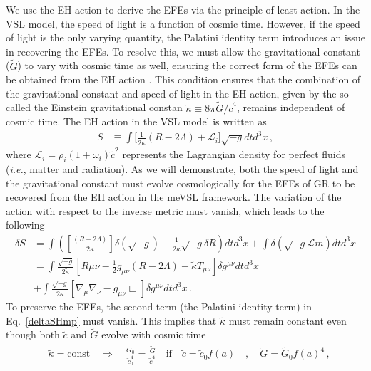 \documentclass[jkps,preprint,fleqn]{revtex4} %
\newcommand{\tc}{\tilde{c}}
\newcommand{\tG}{\tilde{G}}
\newcommand{\tkapp}{\tilde{\kappa}}
\begin{document}
We use the EH action to derive the EFEs via the principle of least action. In the VSL model, the speed of light is a function of cosmic time. However, if the speed of light is the only varying quantity, the Palatini identity term introduces an issue in recovering the EFEs. To resolve this, we must allow the gravitational constant ($\tG$) to vary with cosmic time as well, ensuring the correct form of the EFEs can be obtained from the EH action \cite{Lee:2020zts}. This condition ensures that the combination of the gravitational constant and speed of light in the EH action, given by the so-called the Einstein gravitational constan $\tkapp \equiv 8 \pi \tG/\tc^4$, remains independent of cosmic time.
The EH action in the VSL model is written as 
\begin{align} S &\equiv \int \Biggl[ \frac{1}{2 \tkapp} \left( R - 2 \Lambda \right) + \mathcal{L}_i \Biggr] \sqrt{-g} dt d^3x \label{SHmp} \,, \end{align} 
where $\mathcal{L}_i = \rho_i (1 + \omega_i) \tc^2$ represents the Lagrangian density for perfect fluids (\textit{i.e.}, matter and radiation). As we will demonstrate, both the speed of light and the gravitational constant must evolve cosmologically for the EFEs of GR to be recovered from the EH action in the meVSL framework.
The variation of the action with respect to the inverse metric must vanish, which leads to the following 
\begin{align} \delta S &= \int \left( \left[ \frac{\left( R - 2 \Lambda \right)}{2 \tkapp} \right] \delta \left( \sqrt{-g} \right)  + \frac{1}{2\tkapp} \sqrt{-g} \delta R \right) dt d^3 x + \int \delta \left( \sqrt{-g} \mathcal{L}{m} \right) dt d^3 x \nonumber \\ &= \int \frac{\sqrt{-g}}{2 \tkapp} \left[ R{\mu\nu} - \frac{1}{2} g_{\mu\nu} \left( R - 2 \Lambda \right) - \tkapp T_{\mu\nu} \right] \delta g^{\mu\nu} dtd^3 x \nonumber \\ &+ \int \frac{\sqrt{-g}}{2 \tkapp} \left[ \nabla_{\mu} \nabla_{\nu} - g_{\mu\nu} \Box \right] \delta g^{\mu\nu} dtd^3 x \label{deltaSHmp} \,. \end{align} 
To preserve the EFEs, the second term (the Palatini identity term) in Eq.~\eqref{deltaSHmp} must vanish. This implies that $\tkapp$ must remain constant even though both $\tc$ and $\tG$ evolve with cosmic time 
\begin{align}
&\tkapp = \text{const} \quad \Rightarrow \quad \frac{\tG_0}{\tc_0^4} = \frac{\tG}{\tc^4} \quad \textrm{if} \quad \tc = \tc_0 f(a) \quad , \quad \tG = \tG_{0} f(a)^4 \label{tkappaconstmp} \,,
\end{align}
\end{document}
